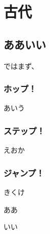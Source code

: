 \documentclass[head_space=20mm,foot_space=20mm,gutter=10mm,line_length=190mm]{jlreq}
\newcommand{\hop}[0]{\subsubsection*{ホップ！}}
\newcommand{\step}[0]{\subsubsection*{ステップ！}}
\newcommand{\jump}[0]{\subsubsection*{ジャンプ！}}
\begin{document}
\maketitle


\tableofcontents %

\clearpage


\section{古代}
\subsection{ああいい}
ではまず、
\hop
あいう
\step
えおか
\jump
きくけ


\clearpage
\begin{thebibliography}{99}
\item ああ
\item いい
\end{thebibliography}
\end{document}
